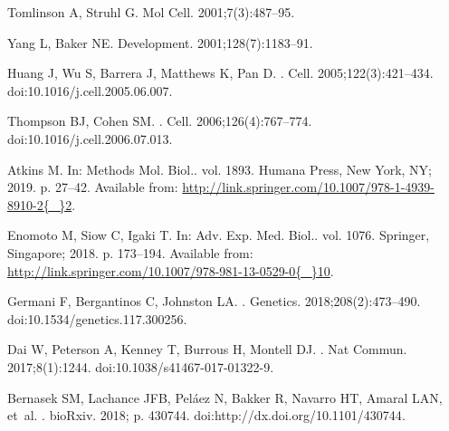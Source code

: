 \documentclass[10pt,letterpaper]{article}
\begin{document}
\begin{thebibliography}{10}
Tomlinson A, Struhl G.
\newblock Mol Cell. 2001;7(3):487--95.

Yang L, Baker NE.
\newblock Development. 2001;128(7):1183--91.

Huang J, Wu S, Barrera J, Matthews K, Pan D.
.
\newblock Cell. 2005;122(3):421--434.
\newblock doi:{10.1016/j.cell.2005.06.007}.

Thompson BJ, Cohen SM.
.
\newblock Cell. 2006;126(4):767--774.
\newblock doi:{10.1016/j.cell.2006.07.013}.

Atkins M.
\newblock In: Methods Mol. Biol.. vol. 1893. Humana Press, New York, NY; 2019.
  p. 27--42.
\newblock Available from:
  \url{http://link.springer.com/10.1007/978-1-4939-8910-2{\_}2}.

Enomoto M, Siow C, Igaki T.
\newblock In: Adv. Exp. Med. Biol.. vol. 1076. Springer, Singapore; 2018. p.
  173--194.
\newblock Available from:
  \url{http://link.springer.com/10.1007/978-981-13-0529-0{\_}10}.

Germani F, Bergantinos C, Johnston LA.
.
\newblock Genetics. 2018;208(2):473--490.
\newblock doi:{10.1534/genetics.117.300256}.

Dai W, Peterson A, Kenney T, Burrous H, Montell DJ.
.
\newblock Nat Commun. 2017;8(1):1244.
\newblock doi:{10.1038/s41467-017-01322-9}.

Bernasek SM, Lachance JFB, Pel{\'{a}}ez N, Bakker R, Navarro HT, Amaral LAN,
  et~al.
.
\newblock bioRxiv. 2018; p. 430744.
\newblock doi:{http://dx.doi.org/10.1101/430744}.


\end{thebibliography}
\end{document}
